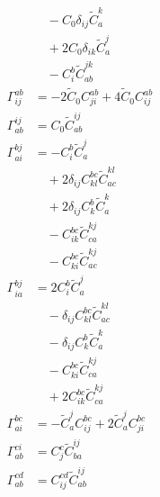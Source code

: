 \begin{align*}
  &\quad -  C_{0} \delta_{i j} \widetilde{C}^{k}_{a}  \\
  &\quad  + 2 C_{0} \delta_{i k} \widetilde{C}^{j}_{a}  \\
  &\quad - C^{b}_{i}  \widetilde{C}^{jk}_{ab} \\
\Gamma^{ab}_{ij} &= -  2 \widetilde{C}_{0} C^{ab}_{ji}   + 4 \widetilde{C}_{0} C^{ab}_{ij} \\
\Gamma^{ij}_{ab} &= C_{0} \widetilde{C}^{ij}_{ab} \\
\Gamma^{bj}_{ai} &= - C^{b}_{i}  \widetilde{C}^{j}_{a}  \\
  &\quad  + 2 \delta_{i j} C^{bc}_{kl}  \widetilde{C}^{kl}_{ac}  \\
  &\quad  + 2 \delta_{i j} C^{b}_{k}  \widetilde{C}^{k}_{a}  \\
  &\quad - C^{bc}_{ik}  \widetilde{C}^{kj}_{ca}  \\
  &\quad - C^{bc}_{ki}  \widetilde{C}^{kj}_{ac} \\
\Gamma^{bj}_{ia} &= 2 C^{b}_{i}  \widetilde{C}^{j}_{a}  \\
  &\quad -  \delta_{i j} C^{bc}_{kl}  \widetilde{C}^{kl}_{ac}  \\
  &\quad -  \delta_{i j} C^{b}_{k}  \widetilde{C}^{k}_{a}  \\
  &\quad - C^{bc}_{ki}  \widetilde{C}^{kj}_{ca}  \\
  &\quad  + 2 C^{bc}_{ik}  \widetilde{C}^{kj}_{ca} \\
\Gamma^{bc}_{ai} &= - \widetilde{C}^{j}_{a}  C^{bc}_{ij}   + 2 \widetilde{C}^{j}_{a}  C^{bc}_{ji} \\
\Gamma^{ci}_{ab} &= C^{c}_{j}  \widetilde{C}^{ij}_{ba} \\
\Gamma^{cd}_{ab} &= C^{cd}_{ij}  \widetilde{C}^{ij}_{ab}
\end{align*}
